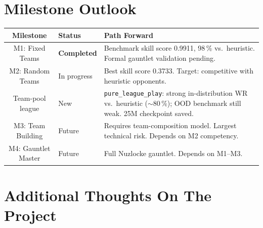 \section{Milestone Outlook}

\begin{center}
\small
\begin{tabularx}{\textwidth}{c l X}
  \toprule
  \textbf{Milestone} & \textbf{Status} & \textbf{Path Forward} \\
  \midrule
  M1: Fixed Teams & \textbf{Completed} &
    Benchmark skill score 0.9911, 98\,\% vs.\ heuristic.
    Formal gauntlet validation pending. \\
  M2: Random Teams & In progress &
    Best skill score 0.3733.  Target: competitive with heuristic opponents. \\
     Team-pool league & New &
    \texttt{pure\_league\_play}: strong in-distribution WR vs.\ heuristic
    ($\sim$80\,\%); OOD benchmark still weak. 25M checkpoint saved. \\
  M3: Team Building & Future &
    Requires team-composition model.  Largest technical risk.
    Depends on M2 competency. \\
  M4: Gauntlet Master & Future &
    Full Nuzlocke gauntlet.  Depends on M1--M3. \\
  \bottomrule
\end{tabularx}
\end{center}

\section{Additional Thoughts On The Project}

